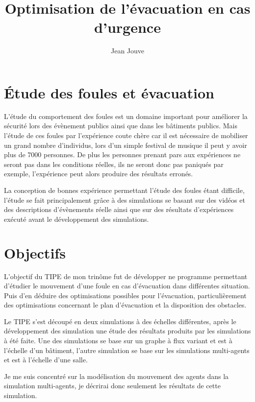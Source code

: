 \documentclass{article}
\title{Optimisation de l'évacuation en cas d'urgence}
\author{Jean Jouve}
\begin{document}
\maketitle

\tableofcontents

\section{Étude des foules et évacuation}

L'étude du comportement des foules est un domaine important pour
améliorer la sécurité lors des évènement publics ainsi que dans
les bâtiments publics. Mais l'étude de ces foules par l'expérience
coute chère car il est nécessaire de mobiliser un grand nombre d'individus,
lors d'un simple festival de musique il peut y avoir plus de 7000 personnes.
De plus les personnes prenant pars aux expériences ne seront pas
dans les conditions réelles, ils ne seront donc pas paniqués par exemple,
l'expérience peut alors produire des résultats erronés.

La conception de bonnes expérience permettant l'étude des foules
étant difficile, l'étude se fait principalement grâce
à des simulations se basant sur des vidéos et des descriptions
d'évènements réelle ainsi que sur des résultats d'expériences
exécuté avant le développement des simulations.


\section{Objectifs}

L'objectif du TIPE de mon trinôme fut de développer ne programme
permettant d'étudier le mouvement d'une foule en cas d'évacuation
dans différentes situation. Puis d'en déduire des optimisations possibles
pour l'évacuation, particulièrement des optimisations concernant le plan
d'évacuation et la disposition des obstacles.

Le TIPE s'est découpé en deux simulations à des échelles différentes, après
le développement des simulation une étude des résultats produits par les
simulations à été faite. Une des simulations se base sur un graphe à flux
variant et  est à l'échelle d'un bâtiment, l'autre simulation se base sur
les simulations multi-agents et est à l'échelle d'une salle.

Je me suis concentré sur la modélisation du mouvement des agents dans la
simulation multi-agents, je décrirai donc seulement les
résultats de cette simulation.
\end{document}
